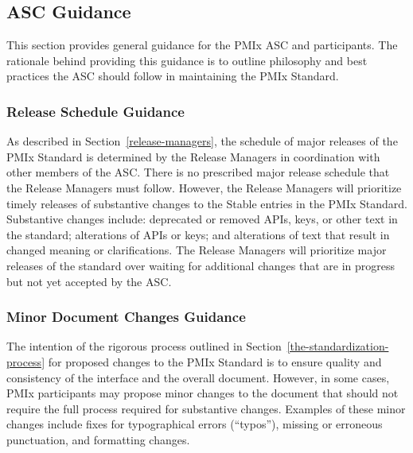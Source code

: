 \documentclass{article}
\begin{document}
\hypertarget{asc-guidance}{%
\subsection{ASC Guidance}%
\label{asc-guidance}}

This section provides general guidance for the PMIx ASC and participants.
The rationale behind providing this guidance is to outline
philosophy and best practices the ASC should follow in 
maintaining the PMIx Standard. 

\hypertarget{release-schedule-guidance}{%
\subsubsection{Release Schedule Guidance}%
\label{release-schedule-guidance}}

As described in Section~\ref{release-managers},
the schedule of major releases of the PMIx
Standard is determined by the Release Managers in coordination with other
members of the ASC. There is no prescribed major release schedule that the
Release Managers must follow. However, the Release Managers will prioritize
timely releases of substantive changes to the Stable entries in the 
PMIx Standard. Substantive changes
include: deprecated or removed
APIs, keys, or other text in the standard; alterations of APIs or keys; and
alterations of text that result in changed meaning or clarifications. The
Release Managers will prioritize major releases of the standard over waiting for
additional changes that are in progress but not yet accepted by the ASC.

\hypertarget{administrative-changes-guidance}{%
\subsubsection{Minor Document Changes Guidance}%
\label{administrative-changes-guidance}}

The intention of the rigorous process outlined in 
Section~\ref{the-standardization-process} for proposed
changes to the PMIx Standard is to ensure quality and consistency of 
the interface and the overall document. However, in some cases, 
PMIx participants may propose minor changes to the document that 
should not require the full process required for substantive changes. 
Examples of these minor changes include fixes for typographical errors 
(``typos''), missing or erroneous punctuation, and formatting changes.
\end{document}
